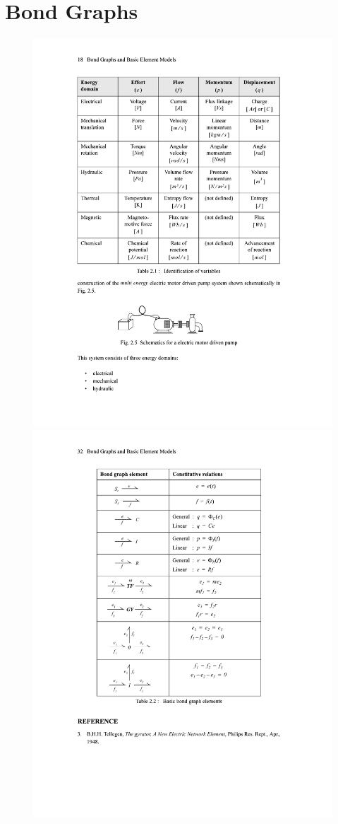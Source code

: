 \section{Bond Graphs}
\begin{figure}[H]
    \centering
    \begin{minipage}{.5\textwidth}
        \centering
        \includegraphics[width=.9\linewidth]{figures/Tabell_EnergyDomain.pdf}
        \label{fig:bond_graph1}
        \includegraphics[width=.9\linewidth]{figures/Tabell_GraphElements.pdf}

\end{minipage}
\end{figure}
